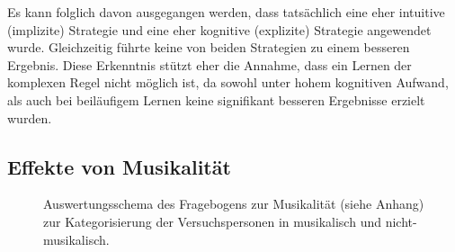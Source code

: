 \documentclass[doc,a4paper,12pt]{apa6}
\begin{document}
Es kann folglich davon ausgegangen werden, dass tatsächlich eine eher intuitive (implizite) Strategie und eine eher kognitive (explizite) Strategie angewendet wurde. Gleichzeitig führte keine von beiden Strategien zu einem besseren Ergebnis. Diese Erkenntnis stützt eher die Annahme, dass ein Lernen der komplexen Regel nicht möglich ist, da sowohl unter hohem kognitiven Aufwand, als auch bei beiläufigem  Lernen keine signifikant besseren Ergebnisse erzielt wurden.

\subsection{Effekte von Musikalität}

\begin{figure}[t]
  \centering
  \begin{minipage}{\textwidth}
    \vspace{10pt}
    \caption[Auswertungsschema des Fragebogens zur Musikalität]{Auswertungsschema des Fragebogens zur Musikalität (siehe Anhang) zur Kategorisierung der Versuchspersonen in musikalisch und nicht-musikalisch.}
    \label{musik:aufbau}
  \end{minipage}
\end{figure}
\end{document}
